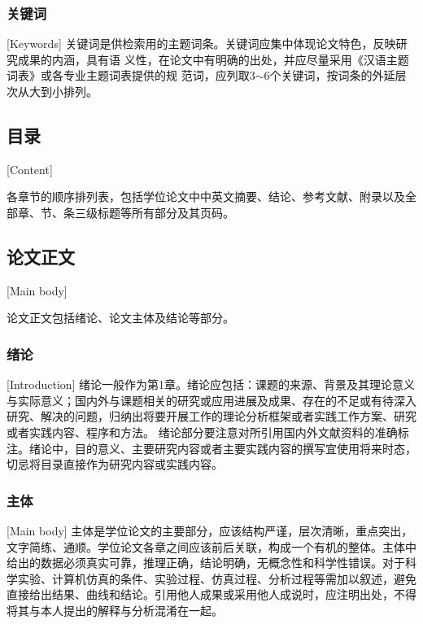 



\subsubsection{关键词}[Keywords]
关键词是供检索用的主题词条。关键词应集中体现论文特色，反映研究成果的内涵，具有语
义性，在论文中有明确的出处，并应尽量采用《汉语主题词表》或各专业主题词表提供的规
范词，应列取3$\sim$6个关键词，按词条的外延层次从大到小排列。

\subsection{目录}[Content]

各章节的顺序排列表，包括学位论文中中英文摘要、结论、参考文献、附录以及全部章、节、条三级标题等所有部分及其页码。

\subsection{论文正文}[Main body]

论文正文包括绪论、论文主体及结论等部分。

\subsubsection{绪论}[Introduction]
绪论一般作为第1章。绪论应包括：课题的来源、背景及其理论意义与实际意义；国内外与课题相关的研究或应用进展及成果、存在的不足或有待深入研究、解决的问题，归纳出将要开展工作的理论分析框架或者实践工作方案、研究或者实践内容、程序和方法。
绪论部分要注意对所引用国内外文献资料的准确标注。绪论中，目的意义、主要研究内容或者主要实践内容的撰写宜使用将来时态，切忌将目录直接作为研究内容或实践内容。


\subsubsection{主体}[Main body]
主体是学位论文的主要部分，应该结构严谨，层次清晰，重点突出，文字简练、通顺。学位论文各章之间应该前后关联，构成一个有机的整体。主体中给出的数据必须真实可靠，推理正确，结论明确，无概念性和科学性错误。对于科学实验、计算机仿真的条件、实验过程、仿真过程、分析过程等需加以叙述，避免直接给出结果、曲线和结论。引用他人成果或采用他人成说时，应注明出处，不得将其与本人提出的解释与分析混淆在一起。

